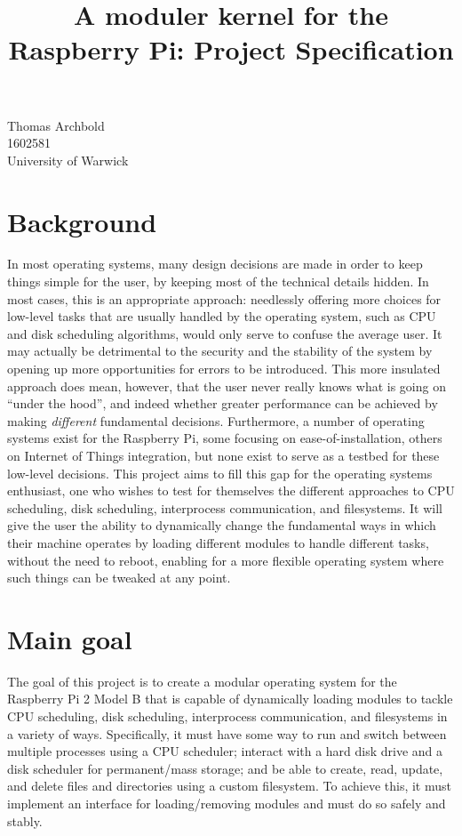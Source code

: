 \documentclass[10pt,a4paper]{article}
\title{A moduler kernel for the Raspberry Pi: Project Specification}
\begin{document}
\maketitle

\begin{center}
    Thomas Archbold \\
    1602581 \\
    University of Warwick \\
\end{center}

\section{Background}
In most operating systems, many design decisions are made in order to keep
things simple for the user, by keeping most of the technical details hidden. In
most cases, this is an appropriate approach: needlessly offering more choices
for low-level tasks that are usually handled by the operating system, such as
CPU and disk scheduling algorithms, would only serve to confuse the average
user. It may actually be detrimental to the security and the stability of the
system by opening up more opportunities for errors to be introduced.  This more
insulated approach does mean, however, that the user never really knows what is
going on ``under the hood'', and indeed whether greater performance can be
achieved by making \textit{different} fundamental decisions.  Furthermore, a
number of operating systems exist for the Raspberry Pi, some focusing on
ease-of-installation, others on Internet of Things integration, but none exist
to serve as a testbed for these low-level decisions. This project aims to fill
this gap for the operating systems enthusiast, one who wishes to test for
themselves the different approaches to CPU scheduling, disk scheduling,
interprocess communication, and filesystems. It will give the user the ability
to dynamically change the fundamental ways in which their machine operates by
loading different modules to handle different tasks, without the need to
reboot, enabling for a more flexible operating system where such things can be
tweaked at any point.

\section{Main goal}
The goal of this project is to create a modular operating system for the
Raspberry Pi 2 Model B that is capable of dynamically loading modules to tackle
CPU scheduling, disk scheduling, interprocess communication, and filesystems in
a variety of ways. Specifically, it must have some way to run and switch
between multiple processes using a CPU scheduler; interact with a hard disk
drive and a disk scheduler for permanent/mass storage; and be able to create,
read, update, and delete files and directories using a custom filesystem. To
achieve this, it must implement an interface for loading/removing modules and
must do so safely and stably.
\end{document}
